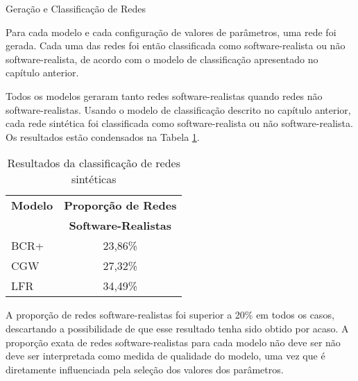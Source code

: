 \begin{section}{Geração e Classificação de Redes}
	
	Para cada modelo e cada configuração de valores de parâmetros, uma rede foi gerada. Cada uma das redes foi então classificada como software-realista ou não software-realista, de acordo com o modelo de classificação apresentado no capítulo anterior.
	

	Todos os modelos geraram tanto redes software-realistas quando redes não software-realistas.
Usando o modelo de classificação descrito no capítulo anterior, cada rede sintética foi classificada como software-realista ou não software-realista. Os resultados estão condensados na Tabela \ref{tab:results}.

\begin{table}
\caption{Resultados da classificação de redes sintéticas}
\centering
\begin{tabular}{|l|c|}
\hline
\textbf{Modelo} & \textbf{Proporção de Redes} \\ & \textbf{Software-Realistas} \\
\hline 
\hline

BCR+ & 23,86\% \\ %
\hline
CGW  & 27,32\% \\  %
\hline
LFR  & 34,49\% \\ %
\hline
\end{tabular}
\label{tab:results}
\end{table}

	A proporção de redes software-realistas foi superior a 20\% em todos os casos, descartando a possibilidade de que esse resultado tenha sido obtido por acaso. A proporção exata de redes software-realistas para cada modelo não deve ser não deve ser interpretada como medida de qualidade do modelo, uma vez que é diretamente influenciada pela seleção dos valores dos parâmetros.
	

\end{section}


